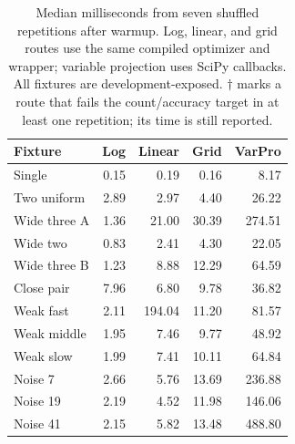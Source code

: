 \begin{table}[htbp]
\centering\small
\caption{Median milliseconds from seven shuffled repetitions after warmup. Log, linear, and grid routes use the same compiled optimizer and wrapper; variable projection uses SciPy callbacks. All fixtures are development-exposed. $\dagger$ marks a route that fails the count/accuracy target in at least one repetition; its time is still reported.}\label{tab:research-timing}
\begin{tabular}{@{}lrrrr@{}}
\toprule
Fixture & Log & Linear & Grid & VarPro \\
\midrule
Single & 0.15 & 0.19 & 0.16 & 8.17 \\
Two uniform & 2.89 & 2.97 & 4.40 & 26.22 \\
Wide three A & 1.36 & 21.00 & 30.39 & 274.51 \\
Wide two & 0.83 & 2.41 & 4.30 & 22.05 \\
Wide three B & 1.23 & 8.88 & 12.29 & 64.59 \\
Close pair & 7.96 & 6.80 & 9.78 & 36.82 \\
Weak fast & 2.11 & 194.04 & 11.20 & 81.57 \\
Weak middle & 1.95 & 7.46 & 9.77 & 48.92 \\
Weak slow & 1.99 & 7.41 & 10.11 & 64.84 \\
Noise 7 & 2.66 & 5.76 & 13.69 & 236.88 \\
Noise 19 & 2.19 & 4.52 & 11.98 & 146.06 \\
Noise 41 & 2.15 & 5.82 & 13.48 & 488.80 \\
\bottomrule
\end{tabular}
\end{table}
